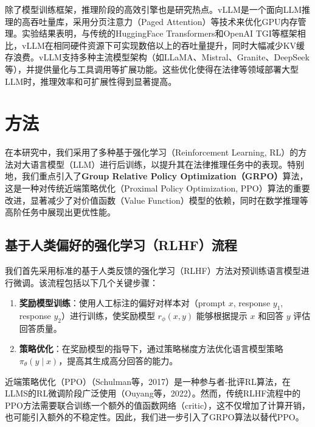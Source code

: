 \documentclass{pkuthesis}
\begin{document}
除了模型训练框架，推理阶段的高效引擎也是研究热点。vLLM是一个面向LLM推理的高吞吐量库，采用分页注意力（Paged Attention）等技术来优化GPU内存管理。实验结果表明，与传统的HuggingFace Transformers和OpenAI TGI等框架相比，vLLM在相同硬件资源下可实现数倍以上的吞吐量提升，同时大幅减少KV缓存浪费。vLLM支持多种主流模型架构（如LLaMA、Mistral、Granite、DeepSeek等），并提供量化与工具调用等扩展功能。这些优化使得在法律等领域部署大型LLM时，推理效率和可扩展性得到显著提高。

\section{方法}
在本研究中，我们采用了多种基于强化学习（Reinforcement Learning, RL）的方法对大语言模型（LLM）进行后训练，以提升其在法律推理任务中的表现。特别地，我们重点引入了\textbf{Group Relative Policy Optimization（GRPO）}算法，这是一种对传统近端策略优化（Proximal Policy Optimization, PPO）算法的重要改进，显著减少了对价值函数（Value Function）模型的依赖，同时在数学推理等高阶任务中展现出更优性能。

\subsection{基于人类偏好的强化学习（RLHF）流程}
我们首先采用标准的基于人类反馈的强化学习（RLHF）方法对预训练语言模型进行微调。该流程包括以下几个关键步骤：
\begin{enumerate}
    \item \textbf{奖励模型训练}：使用人工标注的偏好对样本对（prompt $x$, response $y_1$, response $y_2$）进行训练，使奖励模型 $r_{\phi}(x, y)$ 能够根据提示 $x$ 和回答 $y$ 评估回答质量。
    \item \textbf{策略优化}：在奖励模型的指导下，通过策略梯度方法优化语言模型策略 $\pi_{\theta}(y \mid x)$，提高其生成高分回答的能力。
\end{enumerate}
近端策略优化（PPO）（Schulman等，2017）是一种参与者-批评RL算法，在LLMS的RL微调阶段广泛使用（Ouyang等，2022）。然而，传统RLHF流程中的PPO方法需要联合训练一个额外的值函数网络（critic），这不仅增加了计算开销，也可能引入额外的不稳定性。因此，我们进一步引入了GRPO算法以替代PPO。
\end{document}
